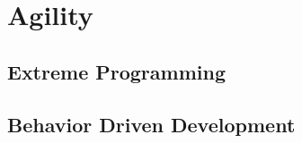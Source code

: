 \section{Agility}\label{sec:agility}


\subsection{Extreme Programming}\label{subsec:extreme-programming}

\subsection{Behavior Driven Development}\label{subsec:bdd}